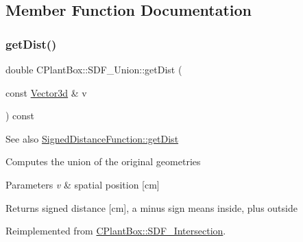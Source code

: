 \subsection{Member Function Documentation}
\mbox{\label{classCPlantBox_1_1SDF__Union_a8da2dd137f1676b7bd66cdcc9c8bef00}} 
\subsubsection{\texorpdfstring{get\+Dist()}{getDist()}}
{\footnotesize\ttfamily double C\+Plant\+Box\+::\+S\+D\+F\+\_\+\+Union\+::get\+Dist (\begin{DoxyParamCaption}\item[{const \hyperlink{classCPlantBox_1_1Vector3d}{Vector3d} \&}]{v }\end{DoxyParamCaption}) const\hspace{0.3cm}{\ttfamily [virtual]}}

\begin{DoxySeeAlso}{See also}
\hyperlink{classCPlantBox_1_1SignedDistanceFunction_a8e58237574af3673906bba84d5d14ee8}{Signed\+Distance\+Function\+::get\+Dist}
\end{DoxySeeAlso}
Computes the union of the original geometries


\begin{DoxyParams}{Parameters}
{\em v} & spatial position \mbox{[}cm\mbox{]} \\
\hline
\end{DoxyParams}
\begin{DoxyReturn}{Returns}
signed distance \mbox{[}cm\mbox{]}, a minus sign means inside, plus outside 
\end{DoxyReturn}


Reimplemented from \hyperlink{classCPlantBox_1_1SDF__Intersection_a2ed780db3881844484086de3f73543e5}{C\+Plant\+Box\+::\+S\+D\+F\+\_\+\+Intersection}.

\mbox{\label{classCPlantBox_1_1SDF__Union_ae73d167fbe4edc64b4f41d2e820a0517}} 
